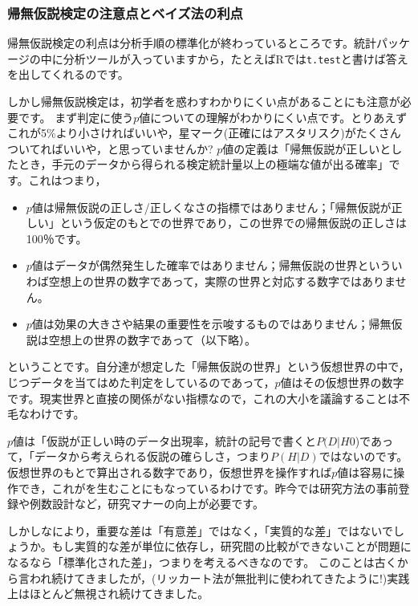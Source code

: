 \documentclass{ltjsbook}
\begin{document}
\subsubsection{帰無仮説検定の注意点とベイズ法の利点}
帰無仮説検定の利点は分析手順の標準化が終わっているところです。統計パッケージの中に分析ツールが入っていますから，たとえばRでは\verb|t.test|と書けば答えを出してくれるのです。

しかし帰無仮説検定は，初学者を惑わすわかりにくい点があることにも注意が必要です。
まず判定に使う$p$値についての理解がわかりにくい点です。とりあえずこれが5\%より小さければいいや，星マーク(正確にはアスタリスク)がたくさんついてればいいや，と思っていませんか?
$p$値の定義は「帰無仮説が正しいとしたとき，手元のデータから得られる検定統計量以上の極端な値が出る確率」です。これはつまり，
\begin{itemize}
    \item $p$値は帰無仮説の正しさ/正しくなさの指標ではありません；「帰無仮説が正しい」という仮定のもとでの世界であり，この世界での帰無仮説の正しさは100％です。
    \item $p$値はデータが偶然発生した確率ではありません；帰無仮説の世界といういわば空想上の世界の数字であって，実際の世界と対応する数字ではありません。
    \item $p$値は効果の大きさや結果の重要性を示唆するものではありません；帰無仮説は空想上の世界の数字であって（以下略）。
\end{itemize}
ということです。自分達が想定した「帰無仮説の世界」という仮想世界の中で，じつデータを当てはめた判定をしているのであって，$p$値はその仮想世界の数字です。現実世界と直接の関係がない指標なので，これの大小を議論することは不毛なわけです。

$p$値は「仮説が正しい時のデータ出現率，統計の記号で書くと$P(D|H0$)であって，「データから考えられる仮説の確らしさ，つまり$P(H|D)$ではないのです。仮想世界のもとで算出される数字であり，仮想世界を操作すれば$p$値は容易に操作でき，これがを生むことにもなっているわけです。昨今では研究方法の事前登録や例数設計など，研究マナーの向上が必要です。

しかしなにより，重要な差は「有意差」ではなく，「実質的な差」ではないでしょうか。もし実質的な差が単位に依存し，研究間の比較ができないことが問題になるなら「標準化された差」，つまりを考えるべきなのです。
このことは古くから言われ続けてきましたが，(リッカート法が無批判に使われてきたように!)実践上はほとんど無視され続けてきました。
\end{document}
